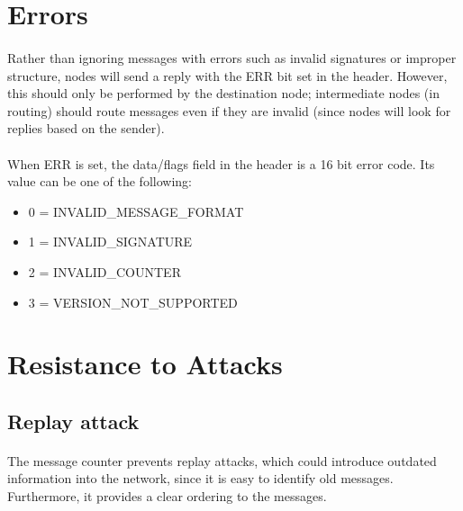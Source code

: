 \documentclass{article}
\begin{document}
\section{Errors}

\paragraph{}
Rather than ignoring messages with errors such as invalid signatures or improper structure, nodes will send a reply with the ERR bit set in the header. However, this should only be performed by the destination node; intermediate nodes (in routing) should route messages even if they are invalid (since nodes will look for replies based on the sender).

\paragraph{}
When ERR is set, the data/flags field in the header is a 16 bit error code. Its value can be one of the following:

\begin{itemize}
\item 0 = INVALID\_MESSAGE\_FORMAT
\item 1 = INVALID\_SIGNATURE
\item 2 = INVALID\_COUNTER
\item 3 = VERSION\_NOT\_SUPPORTED
\end{itemize}

\section{Resistance to Attacks}

\subsection{Replay attack}

\paragraph{}
The message counter prevents replay attacks, which could introduce outdated information into the network, since it is easy to identify old messages. Furthermore, it provides a clear ordering to the messages.
\end{document}
